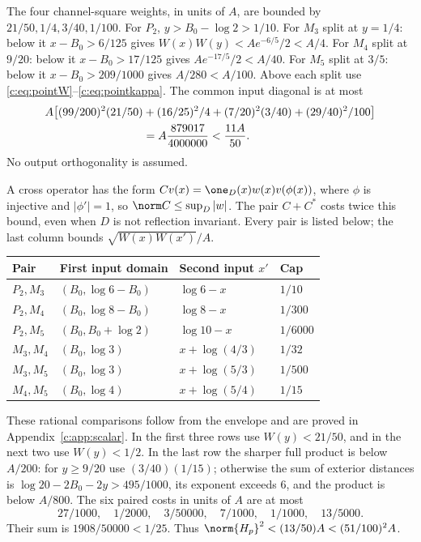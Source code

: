 \documentclass[11pt,a4paper]{article}
\numberwithin{equation}{section}
\theoremstyle{definition}\newtheorem{definition}[theorem]{Definition}
\theoremstyle{remark}\newtheorem{remark}[theorem]{Remark}
\begin{document}
The four channel-square weights, in units of $A$, are bounded by
$21/50,1/4,3/40,1/100$. For $P_2$, $y>{B_0}-\log2>1/10$.
For $M_3$ split at $y=1/4$: below it $x-{B_0}>6/125$ gives
$W(x)W(y)<Ae^{-6/5}/2<A/4$.
For $M_4$ split at $9/20$: below it $x-{B_0}>17/125$ gives $Ae^{-17/5}/2<A/40$.
For $M_5$ split at $3/5$: below it $x-{B_0}>209/1000$ gives $A/280<A/100$.
Above each split use \eqref{c:eq:pointW}--\eqref{c:eq:pointkappa}.
The common input diagonal is at most
\begin{align}
 A\bigl[(99/200)^2(21/50)&+(16/25)^2/4
 +(7/20)^2(3/40)+(29/40)^2/100\bigr]\notag\\
 &=A\frac{879017}{4000000}<\frac{11A}{50}.\label{c:eq:weighteddiag}
\end{align}
No output orthogonality is assumed.

A cross operator has the form $Cv(x)=\one_D(x)w(x)v(\phi(x))$,
where $\phi$ is injective and $|\phi'|=1$, so $\norm C\le\sup_D|w|$.
The pair $C+C^*$ costs twice this bound, even when $D$ is not reflection invariant.
Every pair is listed below; the last column bounds $\sqrt{W(x)W(x')}/A$.
\begin{center}\small
\begin{tabular}{@{}llll@{}}\toprule
Pair & First input domain & Second input $x'$ & Cap\\\midrule
$P_2,M_3$ & $({B_0},\log6-{B_0})$ & $\log6-x$ & $1/10$\\
$P_2,M_4$ & $({B_0},\log8-{B_0})$ & $\log8-x$ & $1/300$\\
$P_2,M_5$ & $({B_0},{B_0}+\log2)$ & $\log10-x$ & $1/6000$\\
$M_3,M_4$ & $({B_0},\log3)$ & $x+\log(4/3)$ & $1/32$\\
$M_3,M_5$ & $({B_0},\log3)$ & $x+\log(5/3)$ & $1/500$\\
$M_4,M_5$ & $({B_0},\log4)$ & $x+\log(5/4)$ & $1/15$\\\bottomrule
\end{tabular}
\end{center}
These rational comparisons follow from the envelope and are proved in Appendix~\ref{c:app:scalar}. In the first three rows use $W(y)<21/50$, and in the next two use $W(y)<1/2$.
In the last row the sharper full product is below $A/200$:
for $y\ge9/20$ use $(3/40)(1/15)$; otherwise the sum of exterior distances is
$\log20-2{B_0}-2y>495/1000$, its exponent exceeds $6$, and the product is below $A/800$.
The six paired costs in units of $A$ are at most
\[
 27/1000,\quad1/2000,\quad3/50000,\quad7/1000,\quad1/1000,\quad13/5000.
\]
Their sum is $1908/50000<1/25$. Thus $\norm{H_p}^2<(13/50)A<(51/100)^2A$.
\end{document}
